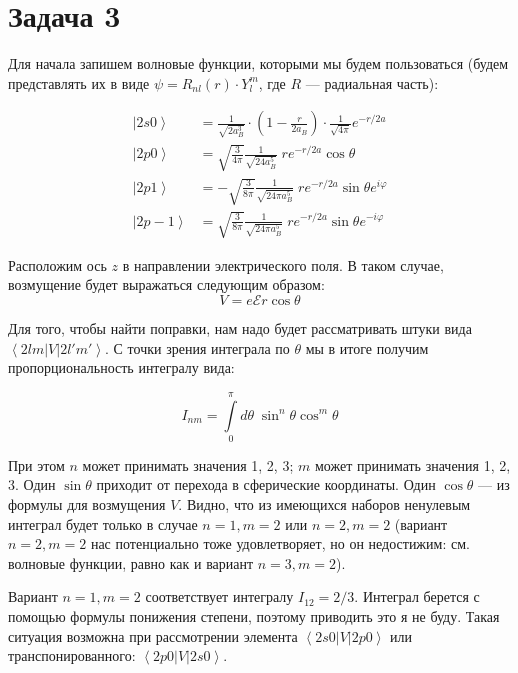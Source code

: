 \documentclass[a4paper, 12pt]{article}
\renewcommand{\phi}{\varphi} %
\newcommand{\bra}[1]
{\ensuremath{\left\langle#1\right|}}
\newcommand{\cat}[1]
{\ensuremath{\left|#1\right\rangle}}
\begin{document}
\section*{Задача 3}

Для начала запишем волновые функции, которыми мы будем пользоваться (будем представлять их в виде $\psi = R_{nl}(r) \cdot Y_{l}^m$, где $R$ --- радиальная часть):

\begin{align*}
	\cat{2s0} &= \frac{1}{\sqrt{2 a_B^3}} \cdot \left(1 - \frac{r}{2a_B}\right) \cdot \frac{1}{\sqrt{4\pi}}e^{-r/2a}\\
	\cat{2p0} &= \sqrt{\frac{3}{4\pi}} \frac{1}{\sqrt{24 a_B^5}}\; r e^{-r/2a} \cos\theta\\
	\cat{2p1} &= -\sqrt{\frac{3}{8\pi}} \frac{1}{\sqrt{24 \pi a_B^5}} \; r e^{-r/2a} \sin \theta e^{i\phi}\\
	\cat{2p-1} &= \sqrt{\frac{3}{8\pi}} \frac{1}{\sqrt{24 \pi a_B^5}} \; r e^{-r/2a} \sin \theta e^{-i\phi}
\end{align*}

Расположим ось $z$ в направлении электрического поля. В таком случае, возмущение будет выражаться следующим образом:
\begin{equation*}
	V = e \mathcal{E} r \cos \theta
\end{equation*}

Для того, чтобы найти поправки, нам надо будет рассматривать штуки вида $\bra{2lm}V\cat{2l'm'}$. С точки зрения интеграла по $\theta$ мы в итоге получим пропорциональность интегралу вида:

\begin{equation}
	I_{nm} = \int\limits_0^\pi d\theta\; \sin^n\theta \cos^m\theta
\end{equation}

При этом $n$ может принимать значения 1, 2, 3; $m$ может принимать значения 1, 2, 3. Один $\sin\theta$ приходит от перехода в сферические координаты. Один $\cos\theta$ --- из формулы для возмущения $V$. Видно, что из имеющихся наборов ненулевым интеграл будет только в случае $n=1, m=2$ или $n=2, m=2$ (вариант $n=2, m=2$ нас потенциально тоже удовлетворяет, но он недостижим: см. волновые функции, равно как и вариант $n=3, m=2$).

Вариант $n=1, m=2$ соответствует интегралу $I_{12} = 2/3$. Интеграл берется с помощью формулы понижения степени, поэтому приводить это я не буду. Такая ситуация возможна при рассмотрении элемента $\bra{2s0}V\cat{2p0}$ или транспонированного: $\bra{2p0}V\cat{2s0}$.
\end{document}
